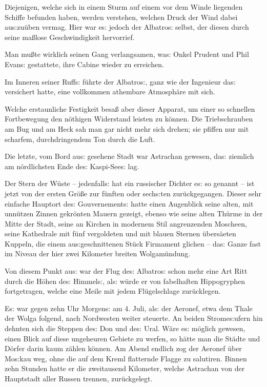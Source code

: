 \documentclass[oneside,12pt]{book}
\newcommand{\s}{s:}
\begin{document}
Diejenigen, welche sich in einem Sturm auf einem vor dem Winde
liegenden Schiffe befunden haben, werden verstehen, welchen Druck der
Wind dabei au{\s}zu\"uben vermag. Hier war e{\s} jedoch der
{\glqq}Albatro{\s}{\grqq} selbst, der diesen durch seine ma{\ss}lose
Geschwindigkeit hervorrief.

Man mu{\ss}te wirklich seinen Gang verlangsamen, wa{\s} Onkel Prudent
und Phil Evan{\s} gestattete, ihre Cabine wieder zu erreichen.

Im Inneren seiner Ruff{\s} f\"uhrte der {\glqq}Albatro{\s}{\grqq},
ganz wie der Ingenieur da{\s} versichert hatte, eine vollkommen
athembare Atmosph\"are mit sich.

Welche erstaunliche Festigkeit besa{\ss} aber dieser Apparat, um
einer so schnellen Fortbewegung den n\"othigen Widerstand leisten zu
k\"onnen. Die Triebschrauben am Bug und am Heck sah man gar nicht
mehr sich drehen; sie pfiffen nur mit scharfem, durchdringendem Ton
durch die Luft.

Die letzte, vom Bord au{\s} gesehene Stadt war Astrachan gewesen,
da{\s} ziemlich am n\"ordlichsten Ende de{\s} Kaspi-See{\s} lag.

Der Stern der W\"uste -- jedenfall{\s} hat ein russischer Dichter
e{\s} so genannt -- ist jetzt von der ersten Gr\"o{\ss}e zur
f\"unften oder sech{\s}ten zur\"uckgegangen. Dieser sehr einfache
Hauptort de{\s} Gouvernement{\s} hatte einen Augenblick seine alten,
mit unn\"utzen Zinnen gekr\"onten Mauern gezeigt, ebenso wie seine
alten Th\"urme in der Mitte der Stadt, seine an Kirchen in modernem
Stil angrenzenden Moscheen, seine Kathedrale mit f\"unf vergoldeten
und mit blauen Sternen \"ubers\"aeten Kuppeln, die einem
au{\s}geschnittenen St\"uck Firmament glichen -- da{\s} Ganze fast im
Niveau der hier zwei Kilometer breiten Wolgam\"undung.

Von diesem Punkt au{\s} war der Flug de{\s} {\glqq}Albatro{\s}{\grqq}
schon mehr eine Art Ritt durch die H\"ohen de{\s} Himmel{\s}, al{\s}
w\"urde er von fabelhaften Hippogryphen fortgetragen, welche eine
Meile mit jedem Fl\"ugelschlage zur\"ucklegen.

E{\s} war gegen zehn Uhr Morgen{\s} am 4. Juli, al{\s} der Aeronef,
etwa dem Thale der Wolga folgend, nach Nordwesten weiter steuerte. An
beiden Strome{\s}ufern hin dehnten sich die Steppen de{\s} Don und
de{\s} Ural. W\"are e{\s} m\"oglich gewesen, einen Blick auf diese
ungeheuren Gebiete zu werfen, so h\"atte man die St\"adte und
D\"orfer darin kaum z\"ahlen k\"onnen. Am Abend endlich zog der
Aeronef \"uber Mo{\s}kau weg, ohne die auf dem Kreml flatternde
Flagge zu salutiren. Binnen zehn Stunden hatte er die zweitausend
Kilometer, welche Astrachan von der Hauptstadt aller Russen trennen,
zur\"uckgelegt.
\end{document}
